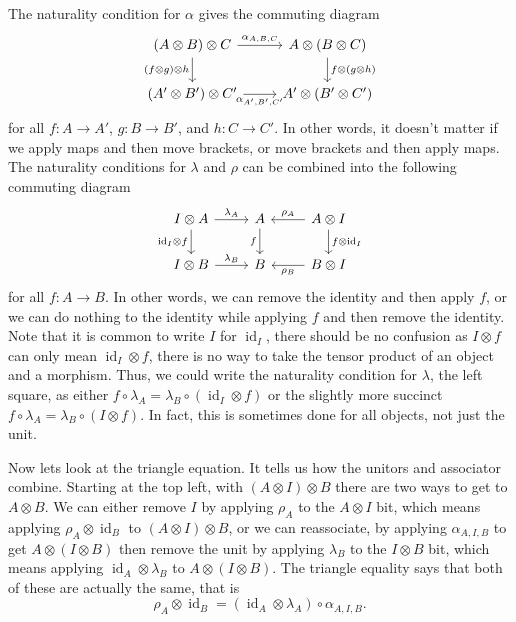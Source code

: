 \documentclass[fleqn]{NotesClass}
\DeclareMathOperator{\id}{id}
\begin{document}
    The naturality condition for \(\alpha\) gives the commuting diagram
    \begin{equation}
        \begin{tikzcd}
            (A \otimes B) \otimes C \arrow[r, "\alpha_{A,B,C}"] \arrow[d, "(f \otimes g) \otimes h"'] & A \otimes (B \otimes C) \arrow[d, "f \otimes (g \otimes h)"]\\
            (A' \otimes B') \otimes C' \arrow[r, "\alpha_{A',B',C'}"'] & A' \otimes (B' \otimes C')
        \end{tikzcd}
    \end{equation}
    for all \(f \colon A \to A'\), \(g \colon B \to B'\), and \(h \colon C \to C'\).
    In other words, it doesn't matter if we apply maps and then move brackets, or move brackets and then apply maps.
    The naturality conditions for \(\lambda\) and \(\rho\) can be combined into the following commuting diagram
    \begin{equation}
        \begin{tikzcd}
            I \otimes A \arrow[r, "\lambda_A"] \arrow[d, "{\id_I} \otimes f"'] & A \arrow[d, "f"'] & A \otimes I \arrow[l, "\rho_A"'] \arrow[d, "f \otimes \id_{I}"]\\
            I \otimes B \arrow[r, "\lambda_B"] & B & B \otimes I \arrow[l, "\rho_B"]
        \end{tikzcd}
    \end{equation}
    for all \(f \colon A \to B\).
    In other words, we can remove the identity and then apply \(f\), or we can do nothing to the identity while applying \(f\) and then remove the identity.
    Note that it is common to write \(I\) for \(\id_I\), there should be no confusion as \(I \otimes f\) can only mean \({\id_I} \otimes f\), there is no way to take the tensor product of an object and a morphism.
    Thus, we could write the naturality condition for \(\lambda\), the left square, as either \(f \circ \lambda_A = \lambda_B \circ ({\id_I} \otimes f)\) or the slightly more succinct \(f \circ \lambda_A = \lambda_B \circ (I \otimes f)\).
    In fact, this is sometimes done for all objects, not just the unit.

    Now lets look at the triangle equation.
    It tells us how the unitors and associator combine.
    Starting at the top left, with \((A \otimes I) \otimes B\) there are two ways to get to \(A \otimes B\).
    We can either remove \(I\) by applying \(\rho_A\) to the \(A \otimes I\) bit, which means applying \(\rho_A \otimes \id_B\) to \((A \otimes I) \otimes B\), or we can reassociate, by applying \(\alpha_{A,I,B}\) to get \(A \otimes (I \otimes B)\) then remove the unit by applying \(\lambda_B\) to the \(I \otimes B\) bit, which means applying \({\id_A} \otimes \lambda_B\) to \(A \otimes (I \otimes B)\).
    The triangle equality says that both of these are actually the same, that is
    \begin{equation}
        \rho_A \otimes \id_B = ({\id_A} \otimes \lambda_A) \circ \alpha_{A,I,B}.
    \end{equation}
\end{document}

